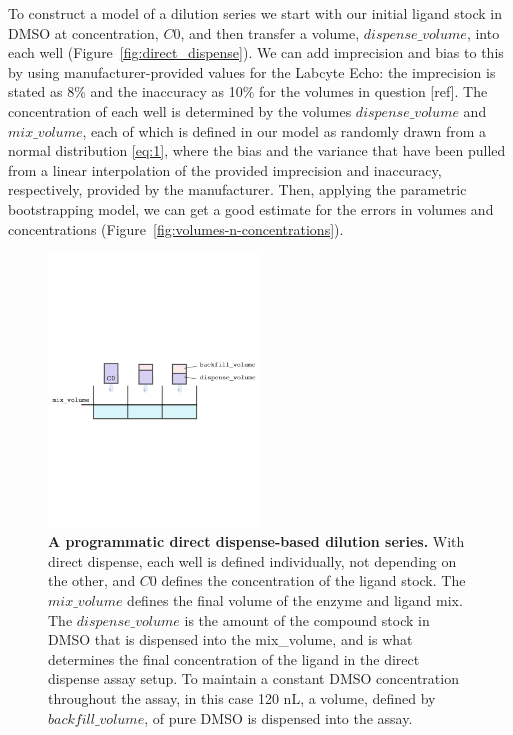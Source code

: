 \documentclass[aps,pre,twocolumn,nofootinbib,superscriptaddress,linenumbers]{revtex4-1}
\begin{document}
To construct a model of a dilution series we start with our initial ligand stock in DMSO at concentration, $C0$, and then transfer a volume, $dispense\_volume$, into each well (Figure~\ref{fig:direct_dispense}). 
We can add imprecision and bias to this by using manufacturer-provided values for the Labcyte Echo: the imprecision is stated as 8\% and the inaccuracy as 10\% for the volumes in question [ref]. 
The concentration of each well is determined by the volumes $dispense\_volume$ and $mix\_volume$, each of which is defined in our model as randomly drawn from a normal distribution \ref{eq:1}, where the bias and the variance that have been pulled from a linear interpolation of the provided imprecision and inaccuracy, respectively, provided by the manufacturer.
Then, applying the parametric bootstrapping model, we can get a good estimate for the errors in volumes and concentrations (Figure~\ref{fig:volumes-n-concentrations}).

\begin{figure}[tb]
    \includegraphics[trim={0 9cm 0 9cm},clip,width=0.5\textwidth]{../figures/direct_dispense.pdf}

  \caption{{\bf A programmatic direct dispense-based dilution series.}
  With direct dispense, each well is defined individually, not depending on the other, and $C0$ defines the concentration of the ligand stock. The $mix\_volume$ defines the final volume of the enzyme and ligand mix. 
  The $dispense\_volume$ is the amount of the compound stock in DMSO that is dispensed into the mix\_volume, and is what determines the final concentration of the ligand in the direct dispense assay setup. 
  To maintain a constant DMSO concentration throughout the assay, in this case 120 nL, a volume, defined by $backfill\_volume$, of pure DMSO is dispensed into the assay.
  }
  \label{ref:direct_dispense}
\end{figure}
\end{document}
